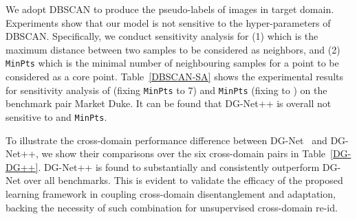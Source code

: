 \documentclass[runningheads]{llncs}
\begin{document}
\begin{table}[b]
\vspace{-12pt}
\centering
{}
\vspace{1mm}
\caption{Comparison between DG-Net and DG-Net++ for unsupervised cross-domain person re-id on the six benchmark pairs.}
\label{DG-DG++}
\vspace{-12pt}
\end{table}

 We adopt DBSCAN to produce the pseudo-labels of images in target domain. Experiments show that our model is not sensitive to the hyper-parameters of DBSCAN. Specifically, we conduct sensitivity analysis for (1)  which is the maximum distance between two samples to be considered as neighbors, and (2) \texttt{MinPts} which is the minimal number of neighbouring samples for a point to be considered as a core point. Table~\ref{DBSCAN-SA} shows the experimental results for sensitivity analysis of  (fixing \texttt{MinPts} to 7) and \texttt{MinPts} (fixing  to ) on the benchmark pair Market  Duke. It can be found that DG-Net++ is overall not sensitive to  and \texttt{MinPts}.

 To illustrate the cross-domain performance difference between DG-Net~\cite{zheng2019joint} and DG-Net++, we show their comparisons over the six cross-domain pairs in Table~\ref{DG-DG++}. DG-Net++ is found to substantially and consistently outperform DG-Net over all benchmarks. This is evident to validate the efficacy of the proposed learning framework in coupling cross-domain disentanglement and adaptation, backing the necessity of such combination for unsupervised cross-domain re-id. 
\end{document}
